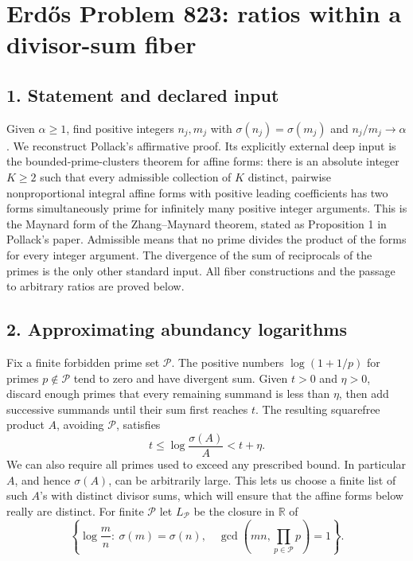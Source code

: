 \section*{Erd\H{o}s Problem 823: ratios within a divisor-sum fiber}
\subsection*{1. Statement and declared input}
Given $\alpha\ge1$, find positive integers $n_j,m_j$ with $\sigma(n_j)=\sigma(m_j)$ and $n_j/m_j\to\alpha$. We reconstruct Pollack's affirmative proof. Its explicitly external deep input is the bounded-prime-clusters theorem for affine forms: there is an absolute integer $K\ge2$ such that every admissible collection of $K$ distinct, pairwise nonproportional integral affine forms with positive leading coefficients has two forms simultaneously prime for infinitely many positive integer arguments. This is the Maynard form of the Zhang--Maynard theorem, stated as Proposition 1 in Pollack's paper. Admissible means that no prime divides the product of the forms for every integer argument.
The divergence of the sum of reciprocals of the primes is the only other standard input. All fiber constructions and the passage to arbitrary ratios are proved below.
\subsection*{2. Approximating abundancy logarithms}
Fix a finite forbidden prime set $\mathcal P$. The positive numbers $\log(1+1/p)$ for primes $p\notin\mathcal P$ tend to zero and have divergent sum. Given $t>0$ and $\eta>0$, discard enough primes that every remaining summand is less than $\eta$, then add successive summands until their sum first reaches $t$. The resulting squarefree product $A$, avoiding $\mathcal P$, satisfies
\[
 t\le\log\frac{\sigma(A)}A<t+\eta.                \tag{1}
\]
We can also require all primes used to exceed any prescribed bound. In particular $A$, and hence $\sigma(A)$, can be arbitrarily large. This lets us choose a finite list of such $A$'s with distinct divisor sums, which will ensure that the affine forms below really are distinct.
For finite $\mathcal P$ let $L_{\mathcal P}$ be the closure in $\mathbb R$ of
\[
 \left\{\log\frac mn:\ \sigma(m)=\sigma(n),\quad
 \gcd\left(mn,\prod_{p\in\mathcal P}p\right)=1\right\}.
\]
